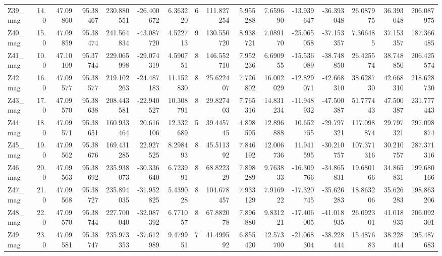 \documentclass[11pt]{article}
\begin{document}
\begin{sidewaystable}
{\begin{tabular}{lrrrrrrrrrrrrrrr}
Z39\_mag &       14.0 &  47.09860 &  95.38467 &  230.880551 & -26.400672 &   6.363220 &   6 &  111.827254 &  5.955288 &   7.659690 &     -13.939647 & -36.393048 &   26.087975 &    36.393048 &   206.087975 \\
Z40\_mag &       15.0 &  47.09859 &  95.38474 &  241.564834 & -43.087720 &   4.522713 &   9 &  130.550720 &  8.938721 &   7.089170 &     -25.065058 & -37.153357 &    7.366485 &    37.153357 &   187.366485 \\
Z41\_mag &       10.0 &  47.10109 &  95.37744 &  229.065998 & -29.074319 &   4.590751 &   8 &  146.552710 &  7.952236 &   6.690955 &     -15.536089 & -38.748850 &   26.425574 &    38.748850 &   206.425574 \\
Z42\_mag &       16.0 &  47.09577 &  95.38577 &  219.102263 & -24.487183 &  11.152830 &   8 &   25.622407 &  7.726802 &  16.002029 &     -12.829071 & -42.668310 &   38.628730 &    42.668310 &   218.628730 \\
Z43\_mag &       17.0 &  47.09570 &  95.38638 &  208.443581 & -22.940527 &  10.308791 &   8 &   29.827403 &  7.765316 &  14.831234 &     -11.948932 & -47.500387 &   51.777443 &    47.500387 &   231.777443 \\
Z44\_mag &       18.0 &  47.09571 &  95.38651 &  160.933464 &  20.616106 &  12.332689 &   5 &   39.445745 &  4.898595 &  12.896888 &      10.652755 & -29.797321 &  117.098874 &    29.797321 &   297.098874 \\
Z45\_mag &       19.0 &  47.09562 &  95.38676 &  169.431285 &  22.927525 &   8.298493 &   8 &   45.511392 &  7.846192 &  12.006736 &      11.941595 & -30.210757 &  107.371316 &    30.210757 &   287.371316 \\
Z46\_mag &       20.0 &  47.09563 &  95.38692 &  235.938073 & -30.336640 &   6.723991 &   8 &   68.822329 &  7.898289 &   9.763833 &     -16.309766 & -34.865831 &   19.680166 &    34.865831 &   199.680166 \\
Z47\_mag &       21.0 &  47.09568 &  95.38727 &  235.894035 & -31.952825 &   5.439028 &   8 &  104.678457 &  7.933129 &   7.916922 &     -17.320745 & -35.626283 &   18.863206 &    35.626283 &   198.863206 \\
Z48\_mag &       22.0 &  47.09570 &  95.38744 &  227.700040 & -32.087392 &   6.771057 &   8 &   67.882078 &  7.896880 &   9.831221 &     -17.406005 & -41.018935 &   26.092301 &    41.018935 &   206.092301 \\
Z49\_mag &       23.0 &  47.09581 &  95.38747 &  235.973353 & -37.612989 &   9.479951 &   7 &   41.499592 &  6.855420 &  12.573700 &     -21.068304 & -38.228444 &   15.487683 &    38.228444 &   195.487683 \\

\end{tabular}}
\end{sidewaystable}
\end{document}
